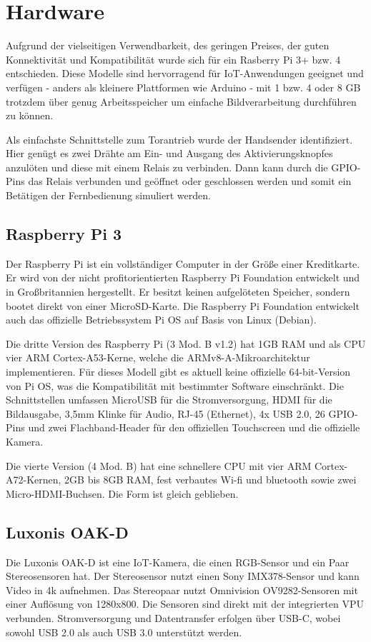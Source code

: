 \section{Hardware}
Aufgrund der vielseitigen Verwendbarkeit, des geringen Preises, der guten Konnektivität und Kompatibilität wurde sich für ein Rasberry Pi 3+ bzw. 4 entschieden. Diese Modelle sind hervorragend für IoT-Anwendungen geeignet und verfügen - anders als kleinere Plattformen wie Arduino - mit 1 bzw. 4 oder 8 GB trotzdem über genug Arbeitsspeicher um einfache Bildverarbeitung durchführen zu können. \autocite[Vgl.][]{todo}

Als einfachste Schnittstelle zum Torantrieb wurde der Handsender identifiziert. Hier genügt es zwei Drähte am Ein- und Ausgang des Aktivierungsknopfes anzulöten und diese mit einem Relais zu verbinden. Dann kann durch die \ac{GPIO}-Pins das Relais verbunden und geöffnet oder geschlossen werden und somit ein Betätigen der Fernbedienung simuliert werden.


\subsection{Raspberry Pi 3}
Der Raspberry Pi ist ein vollständiger Computer in der Größe einer Kreditkarte. Er wird von der nicht profitorientierten Raspberry Pi Foundation entwickelt und in Großbritannien hergestellt. Er besitzt keinen aufgelöteten Speicher, sondern bootet direkt von einer MicroSD-Karte. Die Raspberry Pi Foundation entwickelt auch das offizielle Betriebssystem Pi OS auf Basis von Linux (Debian).

Die dritte Version des Raspberry Pi (3 Mod. B v1.2) hat 1GB RAM und als CPU vier ARM Cortex-A53-Kerne, welche die ARMv8-A-Mikroarchitektur implementieren. Für dieses Modell gibt es aktuell keine offizielle 64-bit-Version von Pi OS, was die Kompatibilität mit bestimmter Software einschränkt.
Die Schnittstellen umfassen MicroUSB für die Stromversorgung, HDMI für die Bildausgabe, 3,5mm Klinke für Audio, RJ-45 (Ethernet), 4x USB 2.0, 26 \ac{GPIO}-Pins und zwei Flachband-Header für den offiziellen Touchscreen und die offizielle Kamera.

Die vierte Version (4 Mod. B) hat eine schnellere CPU mit vier ARM Cortex-A72-Kernen, 2GB bis 8GB RAM, fest verbautes Wi-fi und bluetooth sowie zwei Micro-HDMI-Buchsen. Die Form ist gleich geblieben.

\subsection{Luxonis OAK-D}
Die Luxonis OAK-D ist eine IoT-Kamera, die einen RGB-Sensor und ein Paar Stereosensoren hat. Der Stereosensor nutzt einen Sony IMX378-Sensor und kann Video in 4k aufnehmen. Das Stereopaar nutzt Omnivision OV9282-Sensoren mit einer Auflösung von 1280x800.
Die Sensoren sind direkt mit der integrierten \ac{VPU} verbunden. Stromversorgung und Datentransfer erfolgen über USB-C, wobei sowohl USB 2.0 als auch USB 3.0 unterstützt werden.

